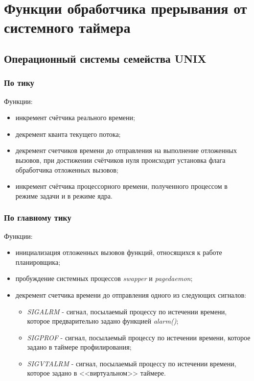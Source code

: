 \section{Функции обработчика прерывания от системного таймера}

\subsection{Операционный системы семейства UNIX}

\subsubsection{По тику}

Функции:
\begin{itemize}[label*=---]
	\item инкремент счётчика реального времени;
	\item декремент кванта текущего потока;
	\item декремент счетчиков времени до отправления на выполнение отложенных вызовов, при достижении счётчиков нуля происходит установка флага обработчика отложенных вызовов;
	\item инкремент счётчика процессорного времени, полученного процессом в режиме задачи и в режиме ядра.
\end{itemize}

\subsubsection{По главному тику}

Функции:
\begin{itemize}[label*=---]
	\item инициализация отложенных вызовов функций, относящихся к работе планировщика;
	\item пробуждение системных процессов \textit{swapper} и \textit{pagedaemon};
	\item декремент счетчика времени до отправления одного из следующих сигналов:
	\begin{itemize}
		\item \textit{SIGALRM} - сигнал, посылаемый процессу по истечении времени, которое предварительно задано функцией \textit{alarm()};
		\item \textit{SIGPROF} - сигнал, посылаемый процессу по истечении времени, которое задано в таймере профилирования;
		\item \textit{SIGVTALRM} - сигнал, посылаемый процессу по истечении времени, которое задано в <<виртуальном>> таймере.
	\end{itemize}
\end{itemize}

